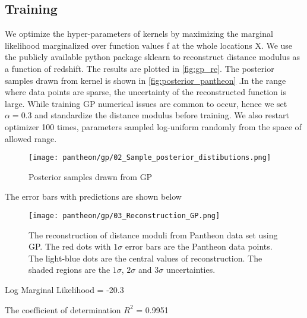 \subsection{Training}
We optimize the hyper-parameters of kernels by maximizing the marginal likelihood marginalized over function values f at the whole locations X. We use the publicly available python package sklearn\cite{scikit-learn} to reconstruct distance modulus as a function of redshift. The results are plotted in \eqref{fig:gp_re}. The posterior samples drawn from kernel is shown in \eqref{fig:posterior_pantheon} .In the range where data points are sparse, the uncertainty of the reconstructed function is large. While training GP numerical issues are common to occur, hence we set $\alpha=0.3$ and standardize the distance modulus before training. We also restart optimizer 100 times, parameters sampled log-uniform randomly from the space of allowed range.

\begin{figure}[h]
	\centering
	\texttt{[image: pantheon/gp/02\_Sample\_posterior\_distibutions.png]}
	\caption{Posterior samples drawn from GP}
	\label{fig:posterior_pantheon}
\end{figure}

The error bars with predictions are shown below
\begin{figure}[h]
	\centering
	\texttt{[image: pantheon/gp/03\_Reconstruction\_GP.png]}
	\caption{The reconstruction of distance moduli from Pantheon data set using GP. The red dots with $1\sigma$ error bars are the Pantheon data points. The light-blue dots are the central values of reconstruction. The shaded regions are the $1\sigma$, $2\sigma$ and $3\sigma$ uncertainties.}
	\label{fig:gp_re}
\end{figure}

Log Marginal Likelihood = -20.3

The coefficient of determination $R^2$ = 0.9951